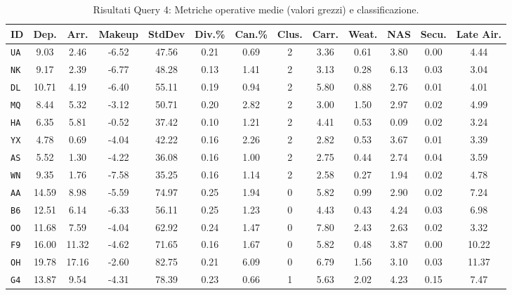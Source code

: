 \documentclass[conference]{IEEEtran}
\begin{document}
\begin{table}[!htbp]
    \centering
    \footnotesize\sffamily
    \caption{Risultati Query 4: Metriche operative medie (valori grezzi) e classificazione.}
    \begin{tabular*}{\textwidth}{@{\extracolsep{\fill}}l|ccccccc|ccccc@{}}
        \toprule
        \textbf{ID} & \textbf{Dep.} & \textbf{Arr.} & \textbf{Makeup} & \textbf{StdDev} & \textbf{Div.\%} & \textbf{Can.\%} & \textbf{Clus.} & \textbf{Carr.} & \textbf{Weat.} & \textbf{NAS} & \textbf{Secu.} & \textbf{Late Air.} \\
        \midrule
        \texttt{UA} & 9.03 & 2.46 & -6.52 & 47.56 & 0.21 & 0.69 & 2 & 3.36 & 0.61 & 3.80 & 0.00 & 4.44 \\
        \texttt{NK} & 9.17 & 2.39 & -6.77 & 48.28 & 0.13 & 1.41 & 2 & 3.13 & 0.28 & 6.13 & 0.03 & 3.04 \\
        \texttt{DL} & 10.71 & 4.19 & -6.40 & 55.11 & 0.19 & 0.94 & 2 & 5.80 & 0.88 & 2.76 & 0.01 & 4.01 \\
        \texttt{MQ} & 8.44 & 5.32 & -3.12 & 50.71 & 0.20 & 2.82 & 2 & 3.00 & 1.50 & 2.97 & 0.02 & 4.99 \\
        \texttt{HA} & 6.35 & 5.81 & -0.52 & 37.42 & 0.10 & 1.21 & 2 & 4.41 & 0.53 & 0.09 & 0.02 & 3.24 \\
        \texttt{YX} & 4.78 & 0.69 & -4.04 & 42.22 & 0.16 & 2.26 & 2 & 2.82 & 0.53 & 3.67 & 0.01 & 3.39 \\
        \texttt{AS} & 5.52 & 1.30 & -4.22 & 36.08 & 0.16 & 1.00 & 2 & 2.75 & 0.44 & 2.74 & 0.04 & 3.59 \\
        \texttt{WN} & 9.35 & 1.76 & -7.58 & 35.25 & 0.16 & 1.14 & 2 & 2.58 & 0.27 & 1.94 & 0.02 & 4.78 \\
        \midrule
        \texttt{AA} & 14.59 & 8.98 & -5.59 & 74.97 & 0.25 & 1.94 & 0 & 5.82 & 0.99 & 2.90 & 0.02 & 7.24 \\
        \texttt{B6} & 12.51 & 6.14 & -6.33 & 56.11 & 0.25 & 1.23 & 0 & 4.43 & 0.43 & 4.24 & 0.03 & 6.98 \\
        \texttt{OO} & 11.68 & 7.59 & -4.04 & 62.92 & 0.24 & 1.47 & 0 & 7.80 & 2.43 & 2.63 & 0.02 & 3.32 \\
        \texttt{F9} & 16.00 & 11.32 & -4.62 & 71.65 & 0.16 & 1.67 & 0 & 5.82 & 0.48 & 3.87 & 0.00 & 10.22 \\
        \texttt{OH} & 19.78 & 17.16 & -2.60 & 82.75 & 0.21 & 6.09 & 0 & 6.79 & 1.56 & 3.10 & 0.03 & 11.37 \\
        \midrule
        \texttt{G4} & 13.87 & 9.54 & -4.31 & 78.39 & 0.23 & 0.66 & 1 & 5.63 & 2.02 & 4.23 & 0.15 & 7.47 \\
        \bottomrule
    \end{tabular*}
    \label{tab:results_q4_metrics}
\end{table}
\end{document}
